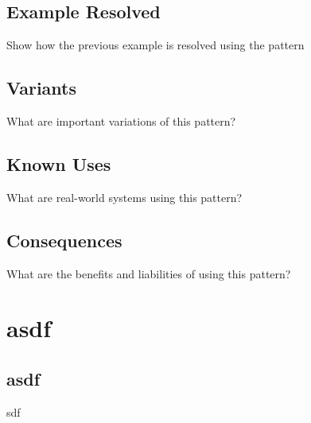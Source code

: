 \documentclass{article}
\begin{document}
\subsection{Example Resolved}
Show how the previous example is resolved using the pattern

\subsection{Variants}
What are important variations of this pattern?

\subsection{Known Uses}
What are real-world systems using this pattern?

\subsection{Consequences}
What are the benefits and liabilities of using this pattern?


\section{asdf}

\subsection{asdf}
sdf
\end{document}
